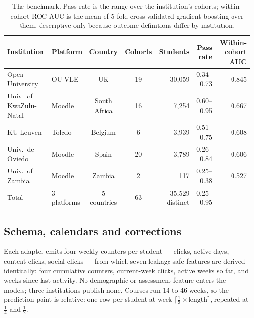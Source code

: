 \documentclass[conference]{IEEEtran}
\begin{document}
\begin{table}[t]
\caption{The benchmark. Pass rate is the range over the institution's cohorts; within-cohort ROC-AUC is the mean of 5-fold cross-validated gradient boosting over them, descriptive only because outcome definitions differ by institution.}
\label{tab:cohorts}
\centering
\begin{tabular}{@{}llccrrr@{}}
\toprule
Institution & Platform & Country & Cohorts & Students & Pass rate & Within-cohort AUC \\
\midrule
Open University \cite{kuzilek2017}       & OU VLE & UK           & 19 & 30{,}059 & 0.34--0.73 & 0.845 \\
Univ.\ of KwaZulu-Natal \cite{raghavjee2026} & Moodle & South Africa & 16 & 7{,}254  & 0.60--0.95 & 0.667 \\
KU Leuven \cite{tiukhova2026}            & Toledo & Belgium      & 6  & 3{,}939  & 0.51--0.75 & 0.608 \\
Univ.\ de Oviedo \cite{riestra2021}      & Moodle & Spain        & 20 & 3{,}789  & 0.26--0.84 & 0.606 \\
Univ.\ of Zambia \cite{phiri2026,phiri2026paper} & Moodle & Zambia       & 2  & 117      & 0.25--0.38 & 0.527 \\
\midrule
Total & 3 platforms & 5 countries & 63 & 35{,}529 distinct & 0.25--0.95 & --- \\
\bottomrule
\end{tabular}
\end{table}

\subsection{Schema, calendars and corrections}

Each adapter emits four weekly counters per student --- clicks, active days,
content clicks, social clicks --- from which seven leakage-safe features are
derived identically: four cumulative counters, current-week clicks, active weeks
so far, and weeks since last activity. No demographic or assessment feature
enters the models; three institutions publish none. Courses run 14 to
46 weeks, so the prediction point is relative: one row per student at week
$\lceil \tfrac{1}{3} \times \text{length} \rceil$, repeated at $\tfrac{1}{4}$ and
$\tfrac{1}{2}$.
\end{document}
